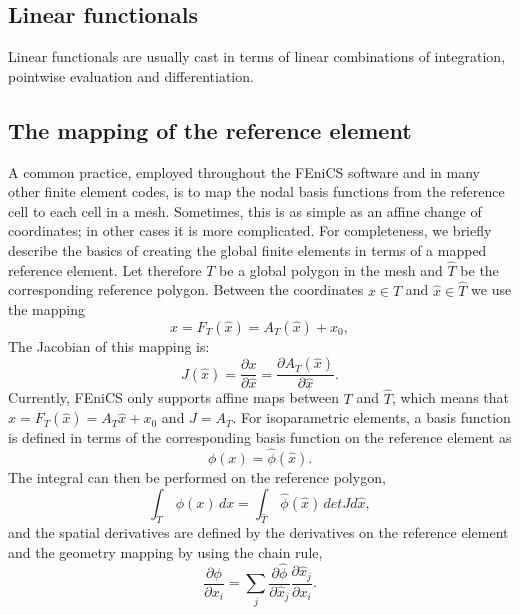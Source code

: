 \subsection{Linear functionals}

Linear functionals are usually cast in terms of linear combinations of
integration, pointwise evaluation and differentiation.


\subsection{The mapping of the reference element}

A common practice, employed throughout the FEniCS software and in many
other finite element codes, is to map the nodal basis functions from the
reference cell to each cell in a mesh.  Sometimes, this is as simple as
an affine change of coordinates; in other cases it is more complicated.
For completeness, we briefly describe the basics of creating the global
finite elements in terms of a mapped reference element. Let therefore
$T$ be a global polygon in the mesh and $\hat{T}$ be the corresponding
reference polygon.  Between the coordinates $x\in T$ and $\hat x\in\hat T$
we use the mapping
\begin{equation}
\label{eq:geometry}
x = F_T(\hat x) = A_T(\hat x)  + x_0,
\end{equation}
The Jacobian of this mapping is:
\begin{equation}
\label{eq:geometry2}
J(\hat x) =  \frac{\partial x }{\partial \hat x}  =    \frac{\partial A_T(\hat x) }{\partial \hat x} .
\end{equation}
Currently, FEniCS only supports affine maps between $T$ and $\hat{T}$,
which means that $x = F_T(\hat x) = A_T\hat x + x_0$ and $J=A_T$.
For isoparametric elements, a basis function is defined in terms of the
corresponding basis function on the reference element as
\begin{equation}
\label{eq:subs}
\phi(x) = \hat{\phi}(\hat x).
\end{equation}
The integral can then be performed on the reference polygon,
\begin{equation}
\label{eq:integration2}
\int_T \, \phi (x) \, dx = \int_{\hat{T}} \, \hat \phi (\hat x) \, detJ d\hat x ,
\end{equation}
and the spatial derivatives are defined by the derivatives on the
reference element and the geometry mapping by using the chain rule,
\begin{equation}
\label{eq:chain}
\frac{\partial \phi}{\partial x_i} =
\sum_j \frac{\partial \hat \phi}{\partial \hat x_j} \frac{\partial \hat x_j }{\partial x_i }  .
\end{equation}

